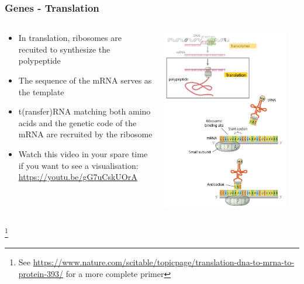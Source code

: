 \documentclass{beamer}
\newcommand\blfootnote[1]{%
	\begingroup
	\renewcommand\thefootnote{}\footnote{#1}%
	\addtocounter{footnote}{-1}%
	\endgroup
}
\begin{document}
\begin{frame}
	\frametitle{Genes - Translation}
	
	
	
	\begin{columns}
		\begin{column}{0.5\textwidth}
			\begin{itemize}
				\scriptsize
				\item In translation, ribosomes are recuited to synthesize the polypeptide
				\vspace{5pt}
				\item The sequence of the mRNA serves as the template
				\vspace{5pt}
				\item t(ransfer)RNA matching both amino acids and the genetic code of the mRNA are recruited by the ribosome
				\vspace{10pt}
				\item Watch this video in your spare time if you want to see a visualisation: \url{ https://youtu.be/gG7uCskUOrA}
			\end{itemize}
			
		\end{column}
		\begin{column}{0.5\textwidth}
			\centering	\includegraphics[keepaspectratio, width  = 0.9\textwidth]{img/translation}\\
		\end{column}
	\end{columns}
	
	\blfootnote{See \url{https://www.nature.com/scitable/topicpage/translation-dna-to-mrna-to-protein-393/} for a more complete primer}
\end{frame}
\end{document}
